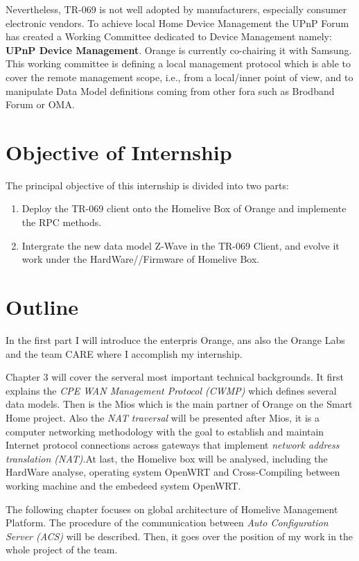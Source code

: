 Nevertheless, TR-069 is not well adopted by manufacturers, especially consumer electronic vendors. To achieve local Home Device Management the UPnP Forum has created a Working Committee dedicated to Device Management namely: \textbf{UPnP Device Management}. Orange is currently co-chairing it with Samsung. This working committee is defining a local management protocol which is able to cover the remote management scope, i.e., from a local/inner point of view, and to manipulate Data Model definitions coming from other fora such as Brodband Forum or OMA.
\section{Objective of Internship}

The principal objective of this internship is divided into two parts:
\begin{enumerate}
\it
\item Deploy the TR-069 client onto the Homelive Box of Orange and implemente the RPC methods.
\item Intergrate the new data model Z-Wave in the TR-069 Client, and evolve it work under the HardWare//Firmware of Homelive Box.
\end{enumerate}

\section{Outline}
In the first part I will introduce the enterpris Orange, ans also the Orange Labs and the team CARE where I accomplish my internship.

Chapter 3 will cover the serveral most important technical backgrounds. It first explains the \textit{CPE WAN Management Protocol (CWMP)} which defines several data models. Then is the Mios which is the main partner of Orange on the Smart Home project. Also the \textit{NAT traversal} will be presented after Mios, it is a computer networking methodology with the goal to establish and maintain Internet protocol connections across gateways that implement \textit{network address translation (NAT)}.At last, the Homelive box will be analysed, including the HardWare analyse, operating system OpenWRT and Cross-Compiling between working machine and the embedeed system OpenWRT.

The following chapter focuses on global architecture of Homelive Management Platform. The procedure of the communication between \textit{Auto Configuration Server (ACS)} will be described. Then, it goes over the position of my work in the whole project of the team.

